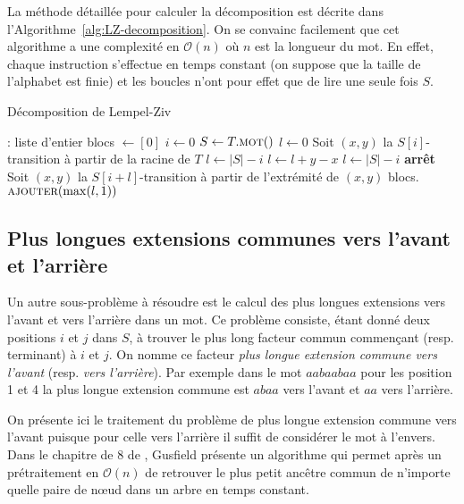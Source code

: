 \documentclass[10pt,letterpaper,oneside]{article}
\newcommand{\algorithmicbreak}{\textbf{arrêt}}
\newcommand{\Break}{\State \algorithmicbreak}
\newcommand{\bigo}{\mathcal{O}}
\begin{document}
La méthode détaillée pour calculer la décomposition est décrite dans l'Algorithme~\ref{alg:LZ-decomposition}. On se convainc facilement que cet algorithme a une complexité en $\bigo(n)$ où $n$ est la longueur du mot. En effet, chaque instruction s'effectue en temps constant (on suppose que la taille de l'alphabet est finie) et les boucles n'ont pour effet que de lire une seule fois $S$.
\begin{algorithm}
\caption{Décomposition de Lempel-Ziv}
\label{alg:LZ-decomposition}
\begin{algorithmic}[1]
    : liste d'entier
        \State blocs $\gets [0]$
        \State $i\gets 0$
        \State $S\gets T.\Call{mot}$
            \State $l\gets 0$
            \State Soit $(x,y)$ la $S[i]$-transition à partir de la racine de $T$
                    \State $l\gets |S|-i$
                \Else
                    \State $l\gets l+y-x$
                \EndIf
                    \State $l\gets |S|-i$
                    \Break
                \EndIf
                \State Soit $(x,y)$ la $S[i+l]$-transition à partir de l'extrémité de $(x,y)$
            \EndWhile
            \State blocs.$\Call{ajouter}{\max(l,1)}$
        \EndWhile
    \EndFunction
\end{algorithmic}
\end{algorithm}
\subsection{Plus longues extensions communes vers l'avant et l'arrière}
Un autre sous-problème à résoudre est le calcul des plus longues extensions vers l'avant et vers l'arrière dans un mot. Ce problème consiste, étant donné deux positions $i$ et $j$ dans $S$, à trouver le plus long facteur commun commençant (resp. terminant) à $i$ et $j$. On nomme ce facteur \emph{plus longue extension commune vers l'avant} (resp. \emph{vers l'arrière}). Par exemple dans le mot $aabaabaa$ pour les position 1 et 4  la plus longue extension commune est $abaa$ vers l'avant et $aa$ vers l'arrière.

On présente ici le traitement du problème de plus longue extension commune vers l'avant puisque pour celle vers l'arrière il suffit de considérer le mot à l'envers. Dans le chapitre de 8 de \cite{MR1460730}, Gusfield présente un algorithme qui permet après un prétraitement en $\bigo(n)$ de retrouver le plus petit ancêtre commun de n'importe quelle paire de nœud dans un arbre en temps constant.
\end{document}
